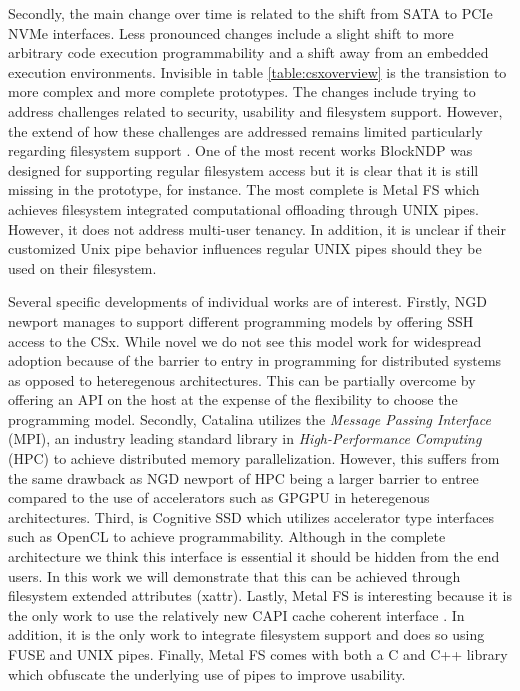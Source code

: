 Secondly, the main change over time is related to the shift from SATA to PCIe
NVMe interfaces. Less pronounced changes include a slight shift to more
arbitrary code execution programmability and a shift away from an embedded
execution environments. Invisible in table \ref{table:csxoverview} is the
transistion to more complex and more complete prototypes. The changes include
trying to address challenges related to security, usability and filesystem
support. However, the extend of how these challenges are addressed remains
limited particularly regarding filesystem support \cite{barbalacecomputational}.
One of the most recent works BlockNDP \cite{10.1145/3429357.3430519} was
designed for supporting regular filesystem access but it is clear that it is
still missing in the prototype, for instance\footnotemark[4]. The most complete
is Metal FS \cite{10.1145/3342195.3387557} which achieves filesystem integrated
computational offloading through UNIX pipes. However, it does not address
multi-user tenancy. In addition, it is unclear if their customized Unix pipe
behavior influences regular UNIX pipes should they be used on their filesystem.


Several specific developments of individual works are of interest. Firstly,
NGD newport \cite{10.1145/3415580} manages to support different programming
models by offering SSH access to the CSx. While novel we do not see this model
work for widespread adoption because of the barrier to entry in programming for
distributed systems as opposed to heteregenous architectures. This can be
partially overcome by offering an API on the host at the expense of the
flexibility to choose the programming model. Secondly, Catalina
\cite{8855540} utilizes the \textit{Message Passing Interface} (MPI), an
industry leading standard library in \textit{High-Performance Computing} (HPC)
to achieve distributed memory parallelization. However, this suffers from the
same drawback as NGD newport of HPC being a larger barrier to entree compared to
the use of accelerators such as GPGPU in heteregenous architectures. Third,
is Cognitive SSD \cite{8839401} which utilizes accelerator type interfaces such
as OpenCL to achieve programmability. Although in the complete architecture we
think this interface is essential it should be hidden from the end users. In
this work we will demonstrate that this can be achieved through filesystem
extended attributes (xattr). Lastly, Metal FS \cite{10.1145/3342195.3387557}
is interesting because it is the only work to use the relatively new CAPI
cache coherent interface \cite{Stuecheli2015CAPIAC}. In addition, it is the only
work to integrate filesystem support and does so using FUSE and UNIX pipes.
Finally, Metal FS comes with both a C and C++ library which obfuscate the
underlying use of pipes to improve usability.


